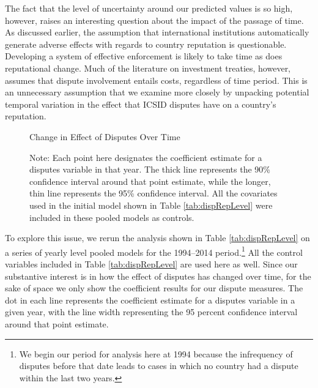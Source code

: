 \documentclass[12pt,onesided]{amsart}
\begin{document}

The fact that the level of uncertainty around our predicted values is so high, however, raises an interesting question about the impact of the passage of time. As discussed earlier, the assumption that international institutions automatically generate adverse effects with regards to country reputation is questionable. Developing a system of effective enforcement is likely to take time as does reputational change. Much of the literature on investment treaties, however, assumes that dispute involvement entails costs, regardless of time period. This is an unnecessary assumption that we examine more closely by unpacking potential temporal variation in the effect that ICSID disputes have on a country's reputation.

\begin{figure}[ht]
	\centering
	\caption{Change in Effect of Disputes Over Time}
	\label{fig:dispEffectYear}
	\resizebox{1\textwidth}{!}{}
	\caption*{Note: Each point here designates the coefficient estimate for a disputes variable in that year. The thick line represents the 90\% confidence interval around that point estimate, while the longer, thin line represents the 95\% confidence interval. All the covariates used in the initial model shown in Table \ref{tab:dispRepLevel} were included in these pooled models as controls.}
\end{figure}
\FloatBarrier

To explore this issue, we rerun the analysis shown in Table \ref{tab:dispRepLevel} on a series of yearly level pooled models for the 1994--2014 period.\footnote{We begin our period for analysis here at 1994 because the infrequency of disputes before that date leads to cases in which no country had a dispute within the last two years.} All the control variables included in Table \ref{tab:dispRepLevel} are used here as well. Since our substantive interest is in how the effect of disputes has changed over time, for the sake of space we only show the coefficient results for our dispute measures. The dot in each line represents the coefficient estimate for a disputes variable in a given year, with the line width representing the 95 percent confidence interval around that point estimate. 
\end{document}
